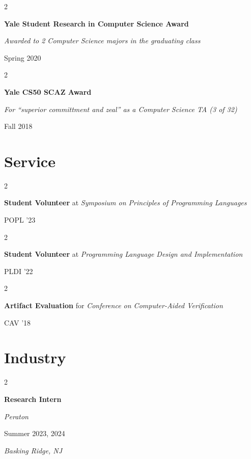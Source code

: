 \documentclass[10pt, letterpaper]{article}
\newenvironment{twocolentry}[2][]{
    \onecolentry
    \def\secondColumn{#2}
    \setcolumnwidth{\fill, 5.5 cm}
    \begin{paracol}{2}
}{
    \switchcolumn \raggedleft \secondColumn
    \end{paracol}
    \endonecolentry
} %
\begin{document}
        \vspace{0.4 cm}

        \begin{twocolentry}{Spring 2020}
            \textbf{Yale Student Research in Computer Science Award}

            \textit{Awarded to 2 Computer Science majors in the graduating class}
        \end{twocolentry}

        \vspace{0.4 cm}

        \begin{twocolentry}{Fall 2018}
            \textbf{Yale CS50 SCAZ Award}

            \textit{For ``superior committment and zeal'' as a Computer Science TA (3 of 32)}
        \end{twocolentry}

    \section{Service}
        
        \begin{twocolentry}{POPL '23}
            \textbf{Student Volunteer} at
            \textit{Symposium on Principles of Programming Languages}
        \end{twocolentry}

        \begin{twocolentry}{PLDI '22}
            \textbf{Student Volunteer} at
            \textit{Programming Language Design and Implementation}
        \end{twocolentry}

        \vspace{0.4 cm}

        \begin{twocolentry}{CAV '18}
            \textbf{Artifact Evaluation} for
            \textit{Conference on Computer-Aided Verification}
        \end{twocolentry}

    \section{Industry}

        \begin{twocolentry}{
        Summer 2023, 2024

        \textit{Basking Ridge, NJ}}
            \textbf{Research Intern}
            
            \textit{Peraton}
        \end{twocolentry}
\end{document}
